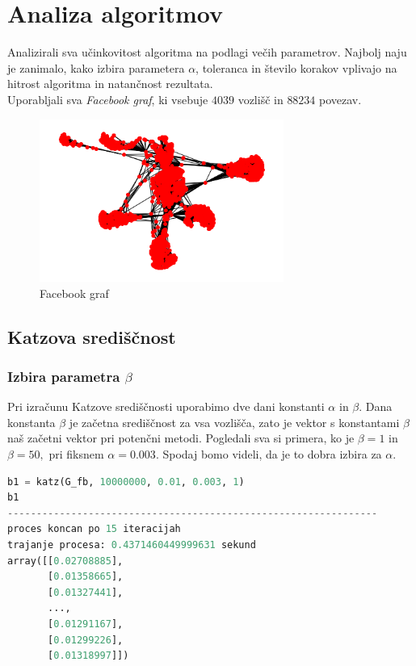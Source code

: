 \documentclass[12pt,a4paper]{amsart}
\begin{document}
\section{Analiza algoritmov}
\hspace{4.8mm}Analizirali sva učinkovitost algoritma na podlagi večih parametrov. Najbolj naju je zanimalo, kako izbira parametera $\alpha$, toleranca in število korakov vplivajo na hitrost algoritma in natančnost rezultata. \\
Uporabljali sva \textit{Facebook graf}, ki vsebuje $4039$ vozlišč in $88234$ povezav.
\begin{figure}[h]
\begin{center} 
\includegraphics[width=8cm]{Facebook_graph.png}
\caption[Facebook graf]{Facebook graf}
\end{center}
\end{figure}

\subsection{Katzova središčnost}
\subsubsection{Izbira parametra $\beta$}
Pri izračunu Katzove središčnosti uporabimo dve dani konstanti $\alpha$ in $\beta.$ Dana konstanta $\beta$ je začetna središčnost za vsa vozlišča, zato je vektor s konstantami $\beta$ naš začetni vektor pri potenčni metodi. Pogledali sva si primera, ko je $\beta =1$ in $\beta =50,$ pri fiksnem $\alpha = 0.003$. Spodaj bomo videli, da je to dobra izbira za $\alpha.$

\begin{lstlisting}[language=Python]
b1 = katz(G_fb, 10000000, 0.01, 0.003, 1)
b1
----------------------------------------------------------------
proces koncan po 15 iteracijah
trajanje procesa: 0.4371460449999631 sekund
array([[0.02708885],
       [0.01358665],
       [0.01327441],
       ...,
       [0.01291167],
       [0.01299226],
       [0.01318997]])
\end{lstlisting}
\end{document}
